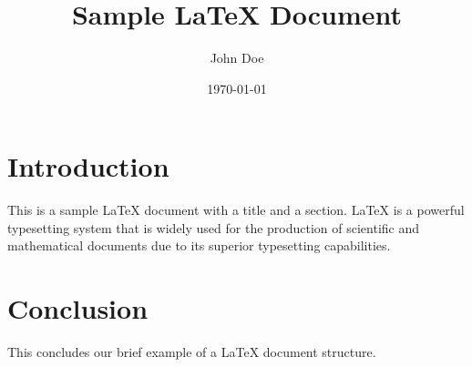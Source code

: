\documentclass{article}
\title{Sample LaTeX Document}
\author{John Doe}
\date{\today}
\begin{document}
\maketitle

\section{Introduction}
This is a sample LaTeX document with a title and a section. LaTeX is a powerful typesetting system that is widely used for the production of scientific and mathematical documents due to its superior typesetting capabilities.

\section{Conclusion}
This concludes our brief example of a LaTeX document structure.
\end{document}
